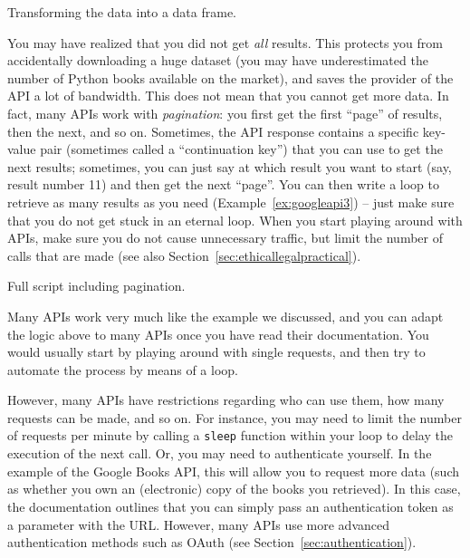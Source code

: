 \begin{ccsexample}
  \caption{Transforming the data into a data frame.}\label{ex:googleapi2}
\end{ccsexample}

You may have realized that you did not get \emph{all} results.
This protects you from accidentally downloading a huge dataset (you
may have underestimated the number of Python books available on the
market), and saves the provider of the API a lot of bandwidth.
This does not mean that you cannot get more data. In fact, many APIs work
with \emph{pagination}: you first get the first ``page'' of results,
then the next, and so on. Sometimes, the API response contains
a specific key-value pair (sometimes called a ``continuation key'')
that you can use to get the next results; sometimes, you can just
say at which result you want to start (say, result number 11) and
then get the next ``page''. You can then write a loop to retrieve
as many results as you need (Example~\ref{ex:googleapi3}) -- just make sure
that you do not get stuck in an eternal loop. When you start playing
around with APIs, make sure you do not cause unnecessary traffic,
but limit the number of calls that are made (see also Section~\ref{sec:ethicallegalpractical}).


\begin{ccsexample}
  \caption{Full script including pagination.}\label{ex:googleapi3}
\end{ccsexample}



Many APIs work very much like the example we discussed, and you
can adapt the logic above to many APIs once you have read their
documentation. You would usually start by playing around with
single requests, and then try to automate the process by means
of a loop.

However, many APIs have restrictions regarding who can use them,
how many requests can be made, and so on.
For instance, you may need to limit the number of requests per minute
by calling a \texttt{sleep} function within your loop to delay the
execution of the next call. Or, you may need to authenticate
yourself. In the example of the Google Books API, this will
allow you to request more data (such as whether you own an
(electronic) copy of the books you retrieved). In this case,
the documentation outlines that you can simply pass an authentication
token as a parameter with the URL. However, many APIs use
more advanced authentication methods such as OAuth (see Section~\ref{sec:authentication}).

